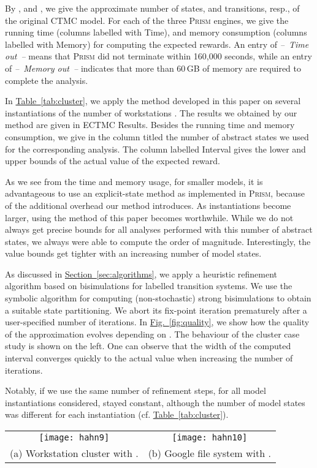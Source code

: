 \documentclass[10pt,twocolumn]{article}
\newcommand{\PRISM}{\textsc{Prism}\xspace}
\newcommand{\timelimit}{\emph{--~Time out~--}}
\newcommand{\memlimit}{\emph{--~Memory out~--}}
\newcommand{\refsec}[1]{\texorpdfstring{\hyperref[sec:#1]{Section~\ref*{sec:#1}}}{Section~\ref*{sec:#1}}}
\newcommand{\reffig}[1]{\texorpdfstring{\hyperref[fig:#1]{Fig.~\ref*{fig:#1}}}{Fig.~\ref*{fig:#1}}}
\newcommand{\reftab}[1]{\texorpdfstring{\hyperref[tab:#1]{Table~\ref*{tab:#1}}}{Table~\ref*{tab:#1}}}
\begin{document}
By , and , we give the approximate number of states, and
transitions, resp., of the original CTMC model. For each of the three
\PRISM engines, we give the running time (columns labelled with Time), and 
memory consumption (columns labelled with Memory) for computing
the expected rewards. An entry of \timelimit{} means that \PRISM did 
not terminate within 160,000 seconds, while an entry of \memlimit{} indicates that 
more than 60\,GB of memory are required to complete the analysis.

In \reftab{cluster}, we apply the method developed in this
paper on several instantiations of the number of workstations .  
The results we obtained by our method are given in ECTMC Results.
Besides the running time and memory consumption, we give in the column
titled  the number of abstract states we used for the corresponding analysis.
The column labelled Interval gives the lower and upper bounds of the actual value of the expected reward.

As we see from the time and memory usage, for smaller models, it is
advantageous to use an explicit-state method as implemented in \PRISM,
because of the additional overhead our method introduces. As
instantiations become larger, using the method of this paper becomes
worthwhile. While we do not always get precise bounds for all
analyses performed with this number of abstract states, we always were
able to compute the order of magnitude. Interestingly, the value
bounds get tighter with an increasing number of model states.

As discussed in \refsec{algorithms}, we apply a heuristic refinement algorithm based on bisimulations for labelled transition systems.
We use the symbolic algorithm \cite{wimmer-et-al-atva-2006} for computing (non-stochastic) strong bisimulations to obtain a suitable state partitioning.
We abort its fix-point iteration prematurely after a user-specified number  of iterations.
In \reffig{quality}, we show how the quality of the
approximation evolves depending on . The behaviour of the cluster
case study is shown on the left. One can observe that the
width of the computed interval converges quickly to the actual value
when increasing the number of iterations. 


Notably, if we use the same number of refinement steps, for all model instantiations
considered,  stayed constant, although the number of model
states  was different for each instantiation (cf. \reftab{cluster}).
\begin{figure*}[tb]
  \centering
  \begin{tabular}{cc}
  \texttt{[image: hahn9]} & \texttt{[image: hahn10]} \\
  \footnotesize (a) Workstation cluster with . & \footnotesize (b) Google file system with .
  \end{tabular}
  \caption{Quality of the ECTMC approximation for different numbers of bisimulation iterations.}
  \label{fig:quality}
\end{figure*}
\end{document}
